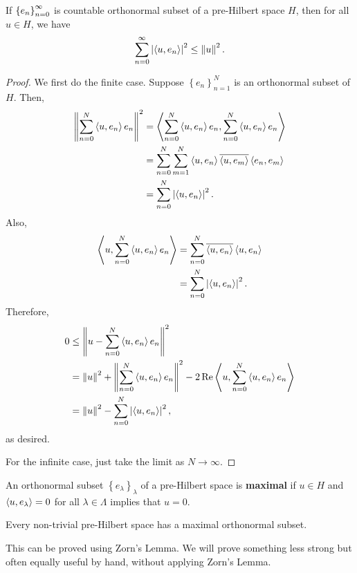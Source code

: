 \documentclass[a4paper]{article}
\begin{document}
\begin{thm}[Bessel]
If $\left\{ e_n \right\}_{n=0}^\infty$ is countable orthonormal subset 
of a pre-Hilbert space $H$, then for all 
$u \in H$, we have 
\[
\sum_{n=0}^\infty \left\lvert \left\langle u, e_n \right\rangle\right\rvert^2 \leq \left\lVert u\right\rVert^2.
\]
\end{thm}

\begin{proof}
  We first do the finite case. Suppose $\left\{ e_n \right\}
  _{n=1}^N$ is an orthonormal subset of $H$. Then, 
  \[
  \begin{aligned}
  \left\lVert \sum_{n=0}^N \left\langle u, e_n \right\rangle e_n\right\rVert^2 
  &= \left\langle \sum_{n=0}^N \left\langle u, e_n \right\rangle e_n , \sum_{n=0}^N \left\langle u, e_n \right\rangle e_n \right\rangle \\
  &= \sum_{n=0}^N 
  \sum_{m=1}^N \left\langle u, e_n \right\rangle \overline{\left\langle u, e_m \right\rangle} \left\langle e_n, e_m \right\rangle \\
  &= \sum_{n=0}^N \left\lvert \left\langle u, e_n \right\rangle\right\rvert^2.
  \end{aligned}
  \]
  Also, 
  \[
  \begin{aligned}
  \left\langle u, \sum_{n=0}^N \left\langle u, e_n \right\rangle e_n \right\rangle 
  &= \sum_{n=0}^N \overline{\left\langle u, e_n \right\rangle} \left\langle u, e_n \right\rangle \\
  &= \sum_{n=0}^N \left\lvert \left\langle u, e_n \right\rangle\right\rvert^2.
  \end{aligned}
  \]
  Therefore, 
  \[
  \begin{aligned}
  0 
  &\leq \left\lVert u - \sum_{n=0}^N \left\langle u, e_n \right\rangle e_n\right\rVert^2 \\
  &= \left\lVert u\right\rVert^2 + \left\lVert \sum_{n=0}^N \left\langle u, e_n \right\rangle e_n\right\rVert^2 
  - 2 \operatorname{Re} \left\langle u, \sum_{n=0}^N \left\langle u, e_n \right\rangle e_n \right\rangle \\
  &= \left\lVert u\right\rVert^2 - \sum_{n=0}^N \left\lvert \left\langle u, e_n \right\rangle\right\rvert^2,
  \end{aligned}
  \]
  as desired.

  For the infinite case, just take the limit as  
  $N \to \infty$.
\end{proof}

\begin{defi}
  An orthonormal subset $\left\{ e_\lambda \right\}_\lambda$
  of a pre-Hilbert space is \textbf{maximal} if $u \in H$ 
  and $\left\langle u, e_\lambda \right\rangle = 0$ for all $\lambda \in \Lambda$
  implies that $u = 0$.
\end{defi}

\begin{thm}
  Every non-trivial pre-Hilbert space has a maximal 
  orthonormal subset.
\end{thm}

This can be proved using Zorn's Lemma. We will prove 
something less strong but often equally useful by hand, 
without applying Zorn's Lemma.
\end{document}
